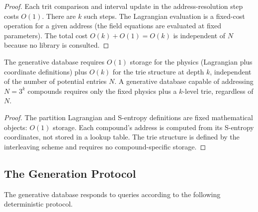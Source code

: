 \begin{proof}
Each trit comparison and interval update in the address-resolution step costs
$O(1)$.  There are $k$ such steps.  The Lagrangian evaluation is a fixed-cost
operation for a given address (the field equations are evaluated at fixed
parameters).  The total cost $O(k) + O(1) = O(k)$ is independent of $N$
because no library is consulted.
\end{proof}

\begin{corollary}
\label{cor:ch23-storage}
The generative database requires $O(1)$ storage for the physics (Lagrangian
plus coordinate definitions) plus $O(k)$ for the trie structure at depth $k$,
independent of the number of potential entries $N$.  A generative database
capable of addressing $N = 3^k$ compounds requires only the fixed physics plus
a $k$-level trie, regardless of $N$.
\end{corollary}

\begin{proof}
The partition Lagrangian and S-entropy definitions are fixed mathematical
objects: $O(1)$ storage.  Each compound's address is computed from its
S-entropy coordinates, not stored in a lookup table.  The trie structure is
defined by the interleaving scheme and requires no compound-specific storage.
\end{proof}

\subsection{The Generation Protocol}
\label{sec:ch23-protocol}

The generative database responds to queries according to the following
deterministic protocol.

